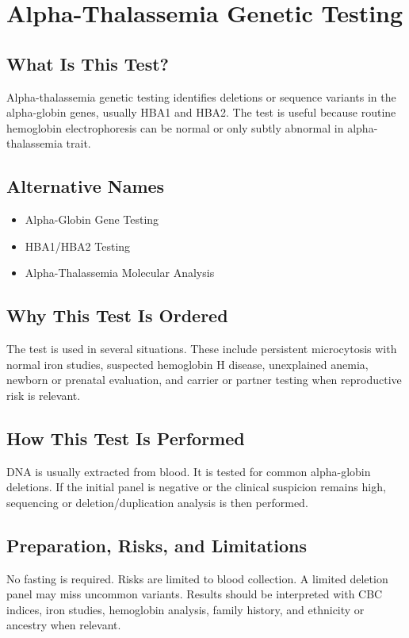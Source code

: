 \chapter{Alpha-Thalassemia Genetic Testing}

\section*{What Is This Test?}
Alpha-thalassemia genetic testing identifies deletions or sequence variants in the alpha-globin genes, usually HBA1 and HBA2. The test is useful because routine hemoglobin electrophoresis can be normal or only subtly abnormal in alpha-thalassemia trait.

\section*{Alternative Names}
\begin{itemize}
  \item Alpha-Globin Gene Testing
  \item HBA1/HBA2 Testing
  \item Alpha-Thalassemia Molecular Analysis
\end{itemize}
\section*{Why This Test Is Ordered}
The test is used in several situations. These include persistent microcytosis with normal iron studies, suspected hemoglobin H disease, unexplained anemia, newborn or prenatal evaluation, and carrier or partner testing when reproductive risk is relevant.

\section*{How This Test Is Performed}
DNA is usually extracted from blood. It is tested for common alpha-globin deletions. If the initial panel is negative or the clinical suspicion remains high, sequencing or deletion/duplication analysis is then performed.

\section*{Preparation, Risks, and Limitations}
No fasting is required. Risks are limited to blood collection. A limited deletion panel may miss uncommon variants. Results should be interpreted with CBC indices, iron studies, hemoglobin analysis, family history, and ethnicity or ancestry when relevant.


